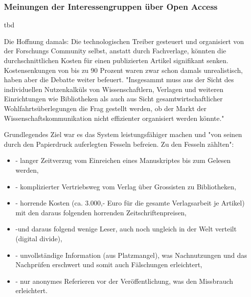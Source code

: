 \subsubsection{Meinungen der Interessengruppen über Open Access}
tbd

Die Hoffnung damals: Die technologischen Treiber gesteuert und organisiert von der Forschungs Community selbst, anstatt durch Fachverlage, könnten die durchschnittlichen Kosten für einen publizierten Artikel signifikant senken. Kostensenkungen von bis zu 90 Prozent\cite{hilf_2004} waren zwar schon damals unrealistisch, haben aber die Debatte weiter befeuert. "Insgesammt muss aus der Sicht des individuellen Nutzenkalküls von Wissenschaftlern, Verlagen und weiteren Einrichtungen wie Bibliotheken als auch aus Sicht gesamtwirtschaftlicher Wohlfahrtsüberlegungen die Frag gestellt werden, ob der Markt der Wissenschaftskommunikation nicht effizienter organisiert werden könnte."\cite{Hess_2006}

Grundlegendes Ziel war es das System leistungsfähiger machen und "von seinen durch den Papierdruck auferlegten Fesseln befreien. Zu den Fesseln zählten"\cite{hilf_2004}:
\begin{itemize}
\item - langer Zeitverzug vom Einreichen eines Manuskriptes bis zum Gelesen werden,
\item - komplizierter Vertriebsweg vom Verlag über Grossisten zu Bibliotheken,
\item - horrende Kosten (ca. 3.000,- Euro für die gesamte Verlagsarbeit je Artikel) mit den daraus folgenden horrenden Zeitschriftenpreisen,
\item -und daraus folgend wenige Leser, auch noch ungleich in der Welt verteilt (digital divide),
\item - unvollständige Information (aus Platzmangel), was Nachnutzungen und das Nachprüfen erschwert und somit auch Fälschungen erleichtert,
\item - nur anonymes Referieren vor der Veröffentlichung, was den Missbrauch erleichtert. 
\end{itemize}




